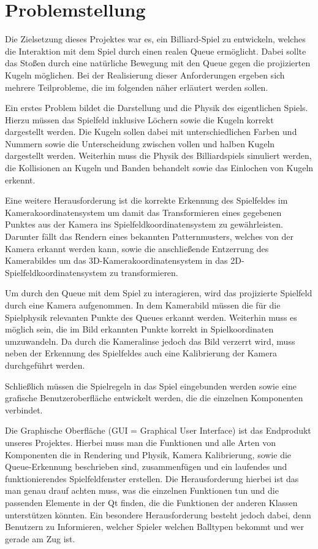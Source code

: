 
\chapter{Problemstellung}
Die Zielsetzung dieses Projektes war es, ein Billiard-Spiel zu entwickeln, welches die Interaktion mit dem Spiel durch einen realen Queue ermöglicht.
Dabei sollte das Stoßen durch eine natürliche Bewegung mit den Queue gegen die projizierten Kugeln möglichen.
Bei der Realisierung dieser Anforderungen ergeben sich mehrere Teilprobleme, die im folgenden näher erläutert werden sollen.

Ein erstes Problem bildet die Darstellung und die Physik des eigentlichen Spiels. Hierzu müssen das Spielfeld inklusive Löchern sowie die Kugeln korrekt dargestellt werden. 
Die Kugeln sollen dabei mit unterschiedlichen Farben und Nummern sowie die Unterscheidung zwischen vollen und halben Kugeln dargestellt werden.
Weiterhin muss die Physik des Billiardspiels simuliert werden, die Kollisionen an Kugeln und Banden behandelt sowie das Einlochen von Kugeln erkennt.

Eine weitere Herausforderung ist die korrekte Erkennung des Spielfeldes im Kamerakoordinatensystem um damit das Transformieren eines gegebenen Punktes aus der Kamera ins Spielfeldkoordinatensystem zu gewährleisten. Darunter fällt das Rendern eines bekannten Patternmusters, welches von der Kamera erkannt werden kann, sowie die anschließende Entzerrung des Kamerabildes um das 3D-Kamerakoordinatensystem in das 2D-Spielfeldkoordinatensystem zu transformieren.

Um durch den Queue mit dem Spiel zu interagieren, wird das projizierte Spielfeld durch eine Kamera aufgenommen. 
In dem Kamerabild müssen die für die Spielphysik relevanten Punkte des Queues erkannt werden.
Weiterhin muss es möglich sein, die im Bild erkannten Punkte korrekt in Spielkoordinaten umzuwandeln.
Da durch die Kameralinse jedoch das Bild verzerrt wird, muss neben der Erkennung des Spielfeldes auch eine Kalibrierung der Kamera durchgeführt werden.

Schließlich müssen die Spielregeln in das Spiel eingebunden werden sowie eine grafische Benutzeroberfläche entwickelt werden, die die einzelnen Komponenten verbindet.

Die Graphische Oberfläche (GUI = Graphical User Interface) ist das Endprodukt unseres Projektes. Hierbei muss man die Funktionen und alle Arten von Komponenten die in Rendering und Physik, Kamera Kalibrierung, sowie die Queue-Erkennung beschrieben sind, zusammenfügen und ein laufendes und funktionierendes Spielfeldfenster erstellen. Die Herausforderung hierbei ist das man genau drauf achten muss, was die einzelnen Funktionen tun und die passenden Elemente in der Qt finden, die die Funktionen der anderen Klassen unterstützen könnten.
Ein besondere Herausforderung besteht jedoch dabei, denn Benutzern zu Informieren, welcher Spieler welchen Balltypen bekommt und wer gerade am Zug ist.

